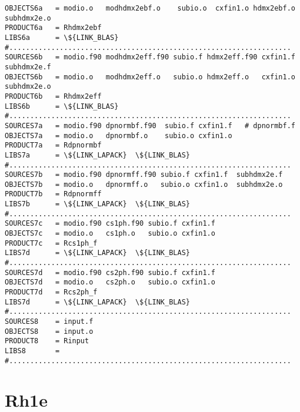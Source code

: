 \begin{verbatim}
OBJECTS6a	= modio.o   modhdmx2ebf.o    subio.o  cxfin1.o hdmx2ebf.o   subhdmx2e.o
PRODUCT6a	= Rhdmx2ebf
LIBS6a   	= \${LINK_BLAS}  
#...................................................................
SOURCES6b	= modio.f90 modhdmx2eff.f90 subio.f hdmx2eff.f90 cxfin1.f subhdmx2e.f
OBJECTS6b	= modio.o   modhdmx2eff.o   subio.o hdmx2eff.o   cxfin1.o subhdmx2e.o 
PRODUCT6b	= Rhdmx2eff
LIBS6b   	= \${LINK_BLAS}  
#...................................................................
SOURCES7a	= modio.f90 dpnormbf.f90  subio.f cxfin1.f   # dpnormbf.f
OBJECTS7a 	= modio.o   dpnormbf.o    subio.o cxfin1.o
PRODUCT7a	= Rdpnormbf
LIBS7a   	= \${LINK_LAPACK}  \${LINK_BLAS}  
#...................................................................
SOURCES7b	= modio.f90 dpnormff.f90 subio.f cxfin1.f  subhdmx2e.f   
OBJECTS7b 	= modio.o   dpnormff.o   subio.o cxfin1.o  subhdmx2e.o
PRODUCT7b	= Rdpnormff
LIBS7b   	= \${LINK_LAPACK}  \${LINK_BLAS}
#...................................................................
SOURCES7c	= modio.f90 cs1ph.f90 subio.f cxfin1.f
OBJECTS7c 	= modio.o   cs1ph.o   subio.o cxfin1.o 
PRODUCT7c	= Rcs1ph_f
LIBS7d   	= \${LINK_LAPACK}  \${LINK_BLAS}
#...................................................................
SOURCES7d	= modio.f90 cs2ph.f90 subio.f cxfin1.f
OBJECTS7d 	= modio.o   cs2ph.o   subio.o cxfin1.o 
PRODUCT7d	= Rcs2ph_f
LIBS7d   	= \${LINK_LAPACK}  \${LINK_BLAS}
#...................................................................
SOURCES8	= input.f
OBJECTS8 	= input.o 
PRODUCT8	= Rinput
LIBS8   	=
#...................................................................

\end{verbatim}


\section{Rh1e}

